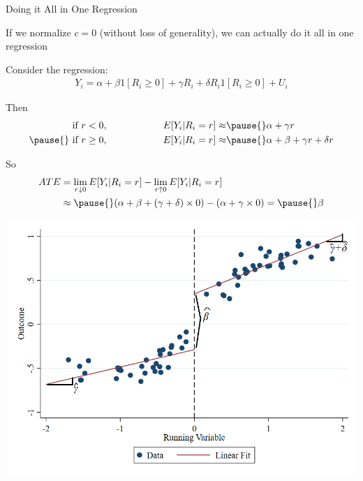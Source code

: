 \documentclass[11pt,english,handout]{beamer}
\newenvironment{wideitemize}{\itemize\addtolength{\itemsep}{10pt}}{\enditemize}
\begin{document}
\begin{frame}{Doing it All in One Regression}
	\begin{wideitemize}
		\item
		If we normalize $c=0$ (without loss of generality), we can actually do it all in one regression
		
		\pause
		\item
		Consider the regression:
		\begin{align*}
			Y_i  = \alpha +  \beta 1[R_i \geq 0]  + \gamma R_i  + \delta  R_i 1[R_i \geq 0 ]  + U_i
		\end{align*}
		
		\pause
		\item
		Then
		\begin{align*}
			  \text{ if } r <0, \hspace{2cm} E[Y_i | R_i = r] \approx & \pause{} \alpha + \gamma r   \\ \pause{}
			 \text{ if }  r \geq 0, \hspace{2cm} E[Y_i | R_i = r] \approx & \pause{} \alpha + \beta  + \gamma r + \delta r 
		\end{align*}
		 
		\pause
		\item
		So 
		\begin{align*}
			ATE& = \lim_{r \downarrow 0} E[Y_{i} | R_i = r] - \lim_{r \uparrow 0} E[Y_{i} | R_i = r] \\
			&\approx \pause{} (\alpha  + \beta + (\gamma + \delta) \times 0 ) - (\alpha + \gamma \times 0 ) = \pause{} \beta 
		\end{align*} 
	\end{wideitemize}
\end{frame}

\begin{frame}
\vspace{0.2cm}
	\centering
	\includegraphics[width = 0.9 \linewidth]{rd_linear2}
\end{frame}
\end{document}
